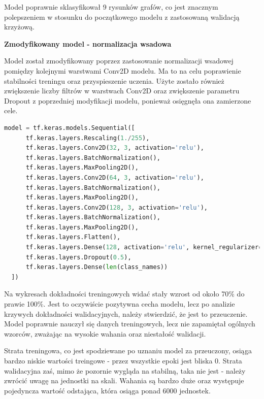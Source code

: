 Model poprawnie sklasyfikował 9 rysunków grafów,
co jest znacznym polepszeniem w stosunku do początkowego modelu z zastosowaną walidacją krzyżową.

\textbf{Zmodyfikowany model - normalizacja wsadowa}

Model został zmodyfikowany poprzez zastosowanie normalizacji wsadowej pomiędzy kolejnymi warstwami Conv2D modelu.
Ma to na celu poprawienie stabilności treningu oraz przyspieszenie uczenia.
Użyte zostało również zwiększenie liczby filtrów w warstwach Conv2D oraz zwiększenie parametru Dropout
z poprzedniej modyfikacji modelu, ponieważ osięgnęła ona zamierzone cele.

\begin{lstlisting}[language=Python,caption=Listing zmodyfikowanego skryptu tworzącego model z walidacją krzyżową - wersja 2,
	label={tests-model-crossval2}]
	model = tf.keras.models.Sequential([
      tf.keras.layers.Rescaling(1./255),
      tf.keras.layers.Conv2D(32, 3, activation='relu'),
      tf.keras.layers.BatchNormalization(),
      tf.keras.layers.MaxPooling2D(),
      tf.keras.layers.Conv2D(64, 3, activation='relu'),
      tf.keras.layers.BatchNormalization(),
      tf.keras.layers.MaxPooling2D(),
      tf.keras.layers.Conv2D(128, 3, activation='relu'),
      tf.keras.layers.BatchNormalization(),
      tf.keras.layers.MaxPooling2D(),
      tf.keras.layers.Flatten(),
      tf.keras.layers.Dense(128, activation='relu', kernel_regularizer=tf.keras.regularizers.l2(0.01)),
      tf.keras.layers.Dropout(0.5),
      tf.keras.layers.Dense(len(class_names))
  ])
\end{lstlisting}

Na wykresach dokładności treningowych widać stały wzrost od około 70\% do prawie 100\%.
Jest to oczywiście pozytywna cecha modelu, lecz po analizie krzywych dokładności walidacyjnych,
należy stwierdzić, że jest to przeuczenie. Model poprawnie nauczył się danych treningowych,
lecz nie zapamiętał ogólnych wzorców, zważając na wysokie wahania oraz niestałość walidacji.

Strata treningowa, co jest spodziewane po uznaniu model za przeuczony,
osiąga bardzo niskie wartości treingowe - przez wszystkie epoki jest bliska 0.
Strata walidacyjna zaś, mimo że pozornie wygląda na stabilną, taka nie jest
- należy zwrócić uwagę na jednostki na skali. Wahania są bardzo duże oraz występuje pojedyncza wartość odstająca,
która osiąga ponad 6000 jednostek.

